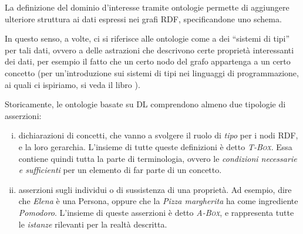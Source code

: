 La definizione del dominio d'interesse tramite ontologie permette di aggiungere ulteriore struttura ai dati espressi nei grafi RDF, specificandone uno schema. 

In questo senso, a volte, ci si riferisce alle ontologie come a dei “sistemi di tipi” per tali dati, ovvero a delle astrazioni che descrivono certe proprietà interessanti dei dati, per esempio il fatto che un certo nodo del grafo appartenga a un certo concetto (per un'introduzione sui sistemi di tipi nei linguaggi di programmazione, ai quali ci ispiriamo, si veda il libro \cite{TypesAndProgrammingLanguages}). 

Storicamente, le ontologie basate su DL comprendono almeno due tipologie di asserzioni:
\begin{enumerate}[i)]
	\item dichiarazioni di concetti, che vanno a svolgere il ruolo di \textit{tipo} per i nodi RDF, e la loro gerarchia. L'insieme di tutte queste definizioni è detto \textsc{\itshape T-Box}. Essa contiene quindi tutta la parte di terminologia, ovvero le \textit{condizioni necessarie e sufficienti} per un elemento di far parte di un concetto.
	\item asserzioni sugli individui o di sussistenza di una proprietà. Ad esempio, dire che \textsl{Elena} è una Persona, oppure che la \textsl{ Pizza margherita} ha come ingrediente \textsl{Pomodoro}. L'insieme di queste asserzioni è detto \textsc{\itshape A-Box}, e rappresenta tutte le \textit{istanze} rilevanti per la realtà descritta.
\end{enumerate}